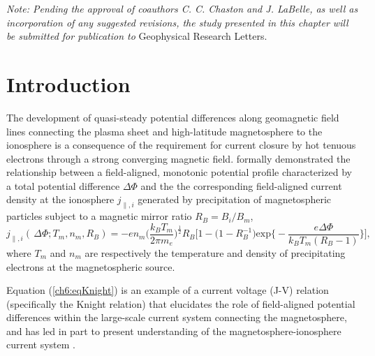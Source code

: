 \textit{Note: Pending the approval of coauthors C. C. Chaston and J. LaBelle, as
  well as incorporation of any suggested revisions, the study presented in this
  chapter will be submitted for publication to} Geophysical Research Letters.

  \section{Introduction}

  The development of quasi-steady potential differences along geomagnetic field
  lines connecting the plasma sheet and high-latitude magnetosphere to the
  ionosphere is a consequence of the requirement for current closure by hot
  tenuous electrons through a strong converging magnetic
  field. \citet{Knight1973} formally demonstrated the relationship between a
  field-aligned, monotonic potential profile characterized by a total potential
  difference $\Delta \Phi$ and the the corresponding field-aligned current
  density at the ionosphere $j_{\parallel,i}$ generated by precipitation of
  magnetospheric particles subject to a magnetic mirror ratio $R_B = B_{i} /
  B_{m}$,
  \begin{equation} \label{ch6:eqKnight} j_{\parallel,i} ( \, \Delta \Phi ; T_m,
    n_m, R_B ) = - e n_m \Big ( \dfrac{k_B T_m}{2 \pi m_e} \Big )^{\frac{1}{2}}
    R_B \Bigg [ 1 - \Big ( 1 - R_B^{-1} \Big ) \textrm{exp} \Big \{ - \dfrac{e
      \Delta \Phi}{k_B T_m ( R_B - 1 )} \Big \} \Bigg],
  \end{equation}
  where $T_m$ and $n_m$ are respectively the temperature and density of
  precipitating electrons at the magnetospheric source.


  Equation (\ref{ch6:eqKnight}) is an example of a current voltage (J-V)
  relation (specifically the Knight relation) that elucidates the role of
  field-aligned potential differences within the large-scale current system
  connecting the magnetosphere, and has led in part to present understanding of
  the magnetosphere-ionosphere current system
  \citep[e.g.,][]{Temerin1997,Hultqvist1999,Cowley2000,Bostrom2003a,Paschmann2003,Pierrard2007a,Karlsson2012}.

